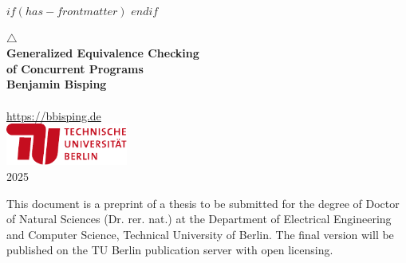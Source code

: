 $if(has-frontmatter)$
\frontmatter
$endif$
%
\makeatletter
  \let\ps@plain\ps@empty
\makeatother
\setlength{\headheight}{15pt}
\addtolength{\headwidth}{\marginparwidth}
\fancyhf{}
\fancyhead[LO]{\nouppercase{\rightmark}}
\fancyhead[RO]{\thepage}
\fancyhead[LE]{\thepage}
\fancyhead[RE]{\nouppercase{\leftmark}}
\renewcommand{\headrulewidth}{0pt}
\pagestyle{fancy}
\begin{titlepage}
    \begin{center}
        \vspace{1.5cm}
        {\Large \(\triangle\)}\\[5pt]
        {\huge\bfseries Generalized Equivalence Checking \\ of Concurrent Programs\\}
        \vspace{1.5cm}
        \vfill
        {\Large\bfseries Benjamin Bisping}\\
        \\[5pt]
        \url{https://bbisping.de}\\[14pt]
        \vfill
        \includegraphics[width=0.3\textwidth]{img/tu-berlin-logo-long-red.pdf}\\[5pt]
        \vspace{3cm}
        {2025}\\
        \vspace{1cm}
    \end{center}
\end{titlepage}
\restoregeometry

\newpage
\thispagestyle{empty}
\par\vspace*{\fill}

\noindent
This document is a preprint of a thesis to be submitted for the degree of Doctor of Natural Sciences (Dr. rer. nat.) at the Department of Electrical Engineering and Computer Science, Technical University of Berlin.
The final version will be published on the TU Berlin publication server with open licensing.

\vspace{0.5cm}

